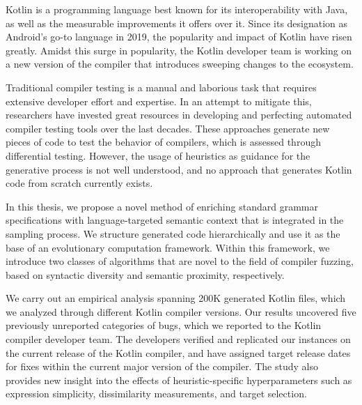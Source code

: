 Kotlin is a programming language best known for
its interoperability with Java, as well as the measurable improvements it offers over it.
Since its designation as Android's go-to language in 2019, the popularity
and impact of Kotlin have risen greatly.
Amidst this surge in popularity, the Kotlin
developer team is working on a new version of the compiler that introduces
sweeping changes to the ecosystem.

Traditional compiler testing is a manual and laborious task
that requires extensive developer effort and expertise.
In an attempt to mitigate this, researchers have invested
great resources in developing and perfecting automated compiler testing tools over the last decades.
These approaches generate new pieces of code to test the behavior
of compilers, which is assessed through differential testing.
However, the usage of heuristics as guidance for the generative process
is not well understood, and no approach that generates Kotlin code from scratch currently exists.

In this thesis, we propose a novel method
of enriching standard grammar specifications with language-targeted semantic
context that is integrated in the sampling process.
We structure generated code hierarchically
and use it as the base of an evolutionary computation framework.
Within this framework, we introduce two
classes of algorithms that are novel to the field
of compiler fuzzing, based on syntactic diversity and semantic proximity, respectively.

We carry out an  empirical analysis spanning 200K generated Kotlin files, 
which we analyzed through different Kotlin compiler versions.
Our results uncovered five previously unreported categories of bugs,
which we reported to the Kotlin compiler developer team.
The developers verified and replicated our instances
on the current release of the Kotlin compiler,
and have assigned target release dates for fixes within the current
major version of the compiler.
The study also provides new insight into
the effects of heuristic-specific hyperparameters such as
expression simplicity, dissimilarity measurements, and target selection.


